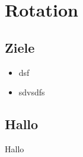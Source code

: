 \renewcommand{\lastmod}{April 29, 2020}

\chapter{Rotation}




\section{Ziele}

\begin{itemize}
\item dsf

\item sdvsdfs

\end{itemize}

\section{Hallo}

Hallo 


\printbibliography[segment=\therefsegment,heading=subbibliography]
